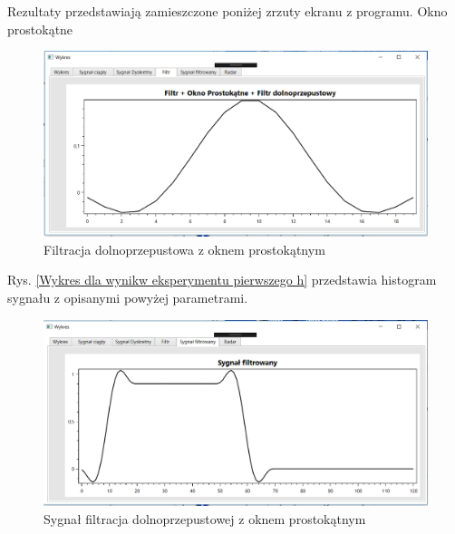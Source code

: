 \documentclass[12pt]{article}
\begin{document}
Rezultaty przedstawiają zamieszczone poniżej zrzuty ekranu z programu. 
\newpage
Okno prostokątne
\begin{figure}[h!]
 \centering
 \includegraphics[width=12.3cm]{prostFDOP.PNG}
 \vspace{-0.3cm}
 \caption{Filtracja dolnoprzepustowa z oknem prostokątnym}
 \label{Wykres dla wyników eksperymentu drugiego}
\end{figure}
\newpage
Rys. \ref{Wykres dla wynikw eksperymentu pierwszego h} przedstawia histogram sygnału z opisanymi powyżej parametrami. 
\begin{figure}[h!]
 \centering
 \includegraphics[width=12.3cm]{prostSFDP.PNG}
 \vspace{-0.3cm}
 \caption{Sygnał filtracja dolnoprzepustowej z oknem prostokątnym}
 \label{Histogram dla wyników eksperymentu drugiego}
\end{figure}
\end{document}
